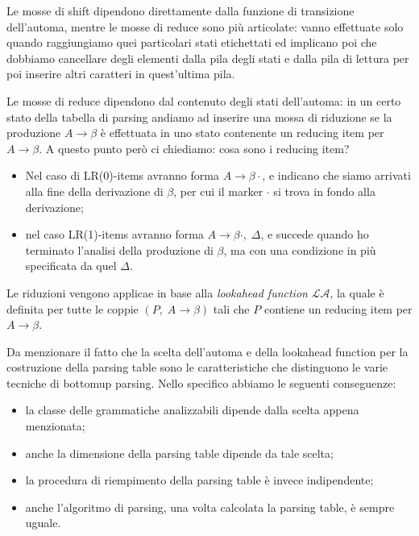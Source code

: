 \documentclass[class=book, crop=false, oneside, 12pt]{standalone}
\begin{document}
Le mosse di shift dipendono direttamente dalla funzione di transizione dell'automa, mentre le mosse di reduce sono più articolate: vanno effettuate solo quando raggiungiamo quei particolari stati etichettati ed implicano poi che dobbiamo cancellare degli elementi dalla pila degli stati e dalla pila di lettura per poi inserire altri caratteri in quest'ultima pila.

Le mosse di reduce dipendono dal contenuto degli stati dell'automa: in un certo stato della tabella di parsing andiamo ad inserire una mossa di riduzione se la produzione \(A \to \beta\) è effettuata in uno stato contenente un reducing item per \(A \to \beta\). A questo punto però ci chiediamo: cosa sono i reducing item?
\begin{itemize}
    \item Nel caso di LR(0)-items avranno forma \(A \to \beta \cdot\), e indicano che siamo arrivati alla fine della derivazione di \(\beta\), per cui il marker \(\cdot\) si trova in fondo alla derivazione;
    \item nel caso LR(1)-items avranno forma \(A \to \beta \cdot, \; \Delta\), e succede quando ho terminato l'analisi della produzione di \(\beta\),  ma con una condizione in più specificata da quel \(\Delta\).
\end{itemize}
Le riduzioni vengono applicae in base alla \emph{lookahead function} \(\mathcal{LA}\), la quale è definita per tutte le coppie \((P,\; A \to \beta)\) tali che \(P\) contiene un reducing item per \(A \to \beta\).

Da menzionare il fatto che la scelta dell'automa e della lookahead function per la costruzione della parsing table sono le caratteristiche che distinguono le varie tecniche di bottomup parsing. Nello specifico abbiamo le seguenti conseguenze:
\begin{itemize}
    \item la classe delle grammatiche analizzabili dipende dalla scelta appena menzionata;
    \item anche la dimensione della parsing table dipende da tale scelta;
    \item la procedura di riempimento della parsing table è invece indipendente;
    \item anche l'algoritmo di parsing, una volta calcolata la parsing table, è sempre uguale.
\end{itemize}
\end{document}
